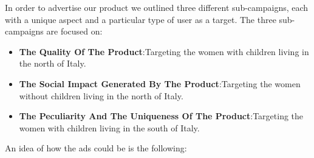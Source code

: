 In order to advertise our product we outlined three different sub-campaigns, each with a unique aspect and a particular type of user as a target. The three sub-campaigns are focused on:
\begin{itemize}
	\item \textbf{The Quality Of The Product}:\@ \newline Targeting the women with children living in the north of Italy.
	\item \textbf{The Social Impact Generated By The Product}:\@ \newline Targeting the women without children living in the north of Italy.
	\item \textbf{The Peculiarity And The Uniqueness Of The Product}:\@ \newline Targeting the women with children living in the south of Italy.
\end{itemize} 
An idea of how the ads could be is the following: \newline\\\\
